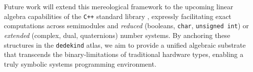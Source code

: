 \documentclass[11pt, a4paper]{report}
\begin{document}
Future work will extend this mereological framework to the upcoming linear algebra capabilities of the \texttt{C++} standard library \cite{P1673R13}, expressly facilitating exact computations across semimodules and \textit{reduced} (booleans, \texttt{char}, \texttt{unsigned int}) or \textit{extended} (complex, dual, quaternions) number systems. By anchoring these structures in the \texttt{dedekind} atlas, we aim to provide a unified algebraic substrate that transcends the binary-limitations of traditional hardware types, enabling a truly symbolic systems programming environment.




\printbibliography
\end{document}
